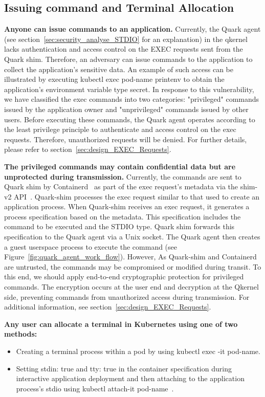 \subsection{Issuing command and Terminal Allocation}
\textbf{Anyone can issue commands to an application.} Currently, the Quark agent (see section~\ref{sec:security_analyse_STDIO} for an explanation) in the qkernel lacks authentication and access control on the EXEC requests sent from the Quark shim. 
Therefore, an adversary can issue commands to the application to collect the application's sensitive data. An example of such access can be illustrated by executing kubectl exec pod-name printenv to obtain the application's environment variable 
type secret. In response to this vulnerability, we have classified the exec commands into two categories: "privileged" commands issued by the application owner and "unprivileged" commands issued by other users. Before executing these commands, the
Quark agent operates according to the least privilege principle to authenticate and access control on the exec requests. Therefore, unauthorized requests will be denied. For further details, please refer to section~\ref{sec:design_EXEC_Requests}.


\textbf{The privileged commands may contain confidential data but are unprotected during transmission.} Currently, the commands are sent to Quark shim by Containerd~\cite*{containerd} as part of the exec request's metadata via the shim- v2 API~\cite*{shim_v2}. 
Quark-shim processes the exec request similar to that used to create an application process. When Quark-shim receives an exec request, it generates a process specification based on the metadata. This specification includes the command to be executed 
and the STDIO type. Quark shim forwards this specification to the Quark agent via a Unix socket. The Quark agent then creates a guest userspace process to execute the command (see Figure~\ref*{fig:quark_agent_work_flow}). However, As 
Quark-shim and Containerd are untrusted, the commands may be compromised or modified during transit. To this end, we should apply end-to-end cryptographic protection for privileged commands. The encryption occurs at the user end and decryption 
at the Qkernel side, preventing commands from unauthorized access during transmission. For additional information, see section~\ref{sec:design_EXEC_Requests}.


\textbf{Any user can allocate a terminal in Kubernetes using one of two methods:}

\begin{itemize}
  \item Creating a terminal process within a pod by using kubectl exec -it pod-name.
  \item Setting stdin: true and tty: true in the container specification during interactive application deployment and then attaching to the application process's stdio using kubectl attach-it pod-name~\cite*{Understanding_sdin}.
\end{itemize}



